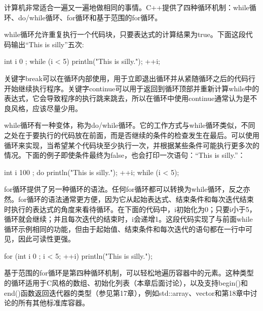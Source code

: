 
计算机非常适合一遍又一遍地做相同的事情。C++提供了四种循环机制：while循环、do/while循环、for循环和基于范围的for循环。


while循环允许重复执行一个代码块，只要表达式的计算结果为true。下面这段代码输出“This is silly”五次:

\begin{cpp}
int i { 0 };
while (i < 5) {
    println("This is silly.");
    ++i;
}
\end{cpp}

关键字break可以在循环内部使用，用于立即退出循环并从紧随循环之后的代码行开始继续执行程序。关键字continue可以用于返回到循环顶部并重新计算while中的表达式，它会导致程序的执行跳来跳去，所以在循环中使用continue通常认为是不良风格，应该尽量少用。


while循环有一种变体，称为do/while循环。它的工作方式与while循环类似，不同之处在于要执行的代码放在前面，而是否继续的条件的检查发生在最后。可以使用循环来实现，当希望某个代码块至少执行一次，并根据某些条件可能执行更多次的情况。下面的例子即使条件最终为false，也会打印一次语句：“This is silly.”：

\begin{cpp}
int i { 100 };
do {
    println("This is silly.");
    ++i;
} while (i < 5);
\end{cpp}


for循环提供了另一种循环的语法。任何for循环都可以转换为while循环，反之亦然。for循环的语法通常更方便，因为它从起始表达式、结束条件和每次迭代结束时执行的表达式的角度来看待循环。在下面的代码中，i初始化为0；只要i小于5，循环就会继续；并且每次迭代的结束时，i会递增1。这段代码实现了与前面while循环示例相同的功能，但由于起始值、结束条件和每次迭代的语句都在一行中可见，因此可读性更强。

\begin{cpp}
for (int i { 0 }; i < 5; ++i) {
    println("This is silly.");
}
\end{cpp}


基于范围的for循环是第四种循环机制，可以轻松地遍历容器中的元素。这种类型的循环适用于C风格的数组、初始化列表（本章后面讨论），以及支持begin()和end()函数返回迭代器的类型（参见第17章），例如std::array、vector和第18章中讨论的所有其他标准库容器。

